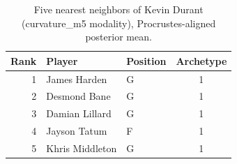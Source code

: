 \begin{table}[htbp]
  \centering\small
  \begin{tabular}{rllc}
    \toprule
    Rank & Player & Position & Archetype \\
    \midrule
    1 & James Harden & G & 1 \\
    2 & Desmond Bane & G & 1 \\
    3 & Damian Lillard & G & 1 \\
    4 & Jayson Tatum & F & 1 \\
    5 & Khris Middleton & G & 1 \\
    \bottomrule
  \end{tabular}
  \caption{Five nearest neighbors of Kevin Durant (curvature_m5 modality), Procrustes-aligned posterior mean.}
  \label{tab:Kevin_Durant_neighbors_curvature_m5}
\end{table}

